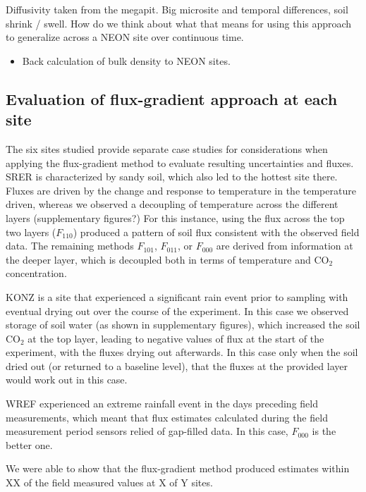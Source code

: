 \documentclass[
  letterpaper,
  DIV=11,
  numbers=noendperiod]{scrartcl}
\providecommand{\tightlist}{%
  \setlength{\itemsep}{0pt}\setlength{\parskip}{0pt}}\usepackage{longtable,booktabs,array}
\begin{document}
Diffusivity taken from the megapit. Big microsite and temporal
differences, soil shrink / swell. How do we think about what that means
for using this approach to generalize across a NEON site over continuous
time.

\begin{itemize}
\tightlist
\item
  Back calculation of bulk density to NEON sites.
\end{itemize}

\subsection{Evaluation of flux-gradient approach at each
site}\label{evaluation-of-flux-gradient-approach-at-each-site}

The six sites studied provide separate case studies for considerations
when applying the flux-gradient method to evaluate resulting
uncertainties and fluxes. SRER is characterized by sandy soil, which
also led to the hottest site there. Fluxes are driven by the change and
response to temperature in the temperature driven, whereas we observed a
decoupling of temperature across the different layers (supplementary
figures?) For this instance, using the flux across the top two layers
(\(F_{110}\)) produced a pattern of soil flux consistent with the
observed field data. The remaining methods \(F_{101}\), \(F_{011}\), or
\(F_{000}\) are derived from information at the deeper layer, which is
decoupled both in terms of temperature and CO\(_{2}\) concentration.

KONZ is a site that experienced a significant rain event prior to
sampling with eventual drying out over the course of the experiment. In
this case we observed storage of soil water (as shown in supplementary
figures), which increased the soil CO\(_{2}\) at the top layer, leading
to negative values of flux at the start of the experiment, with the
fluxes drying out afterwards. In this case only when the soil dried out
(or returned to a baseline level), that the fluxes at the provided layer
would work out in this case.

WREF experienced an extreme rainfall event in the days preceding field
measurements, which meant that flux estimates calculated during the
field measurement period sensors relied of gap-filled data. In this
case, \(F_{000}\) is the better one.

We were able to show that the flux-gradient method produced estimates
within XX of the field measured values at X of Y sites.
\end{document}
